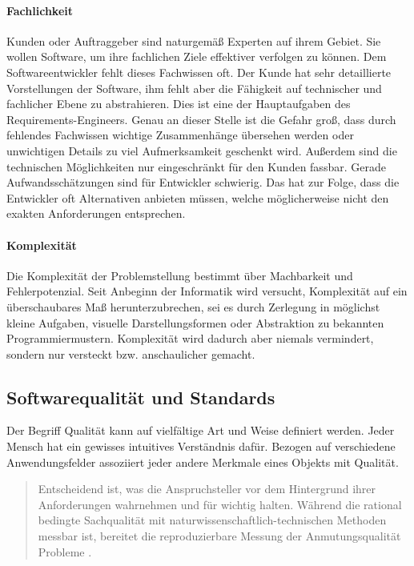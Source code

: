 \paragraph{Fachlichkeit}
Kunden oder Auftraggeber sind naturgemäß Experten auf ihrem Gebiet. Sie wollen Software, um ihre fachlichen Ziele effektiver verfolgen zu können. Dem Softwareentwickler fehlt dieses Fachwissen oft.
Der Kunde hat sehr detaillierte Vorstellungen der Software, ihm fehlt aber die Fähigkeit auf technischer und fachlicher Ebene zu abstrahieren. Dies ist eine der Hauptaufgaben des Requirements-Engineers. Genau an dieser Stelle ist die Gefahr groß, dass durch fehlendes Fachwissen wichtige Zusammenhänge übersehen werden oder unwichtigen Details zu viel Aufmerksamkeit geschenkt wird.
Außerdem sind die technischen Möglichkeiten nur eingeschränkt für den Kunden fassbar. Gerade Aufwandsschätzungen sind für Entwickler schwierig. Das hat zur Folge, dass die Entwickler oft Alternativen anbieten müssen, welche möglicherweise nicht den exakten Anforderungen entsprechen.

\paragraph{Komplexität}
Die Komplexität der Problemstellung bestimmt über Machbarkeit und Fehlerpotenzial. Seit Anbeginn der Informatik wird versucht, Komplexität auf ein überschaubares Maß herunterzubrechen, sei es durch Zerlegung in möglichst kleine Aufgaben, visuelle Darstellungsformen oder Abstraktion zu bekannten Programmiermustern.
Komplexität wird dadurch aber niemals vermindert, sondern nur versteckt bzw. anschaulicher gemacht.


\subsection{Softwarequalität und Standards}
\label{sec:quality}
Der Begriff Qualität kann auf vielfältige Art und Weise definiert werden. Jeder Mensch hat ein gewisses intuitives Verständnis dafür. Bezogen auf verschiedene Anwendungsfelder assoziiert jeder andere Merkmale eines Objekts mit Qualität.

\begin{quote}
Entscheidend ist, was die Anspruchsteller vor dem Hintergrund ihrer Anforderungen wahrnehmen und für wichtig halten. Während die rational bedingte Sachqualität mit naturwissenschaftlich-technischen Methoden messbar ist, bereitet die reproduzierbare Messung der Anmutungsqualität Probleme \cite{markgraf_definition_2015}.
\end{quote}

